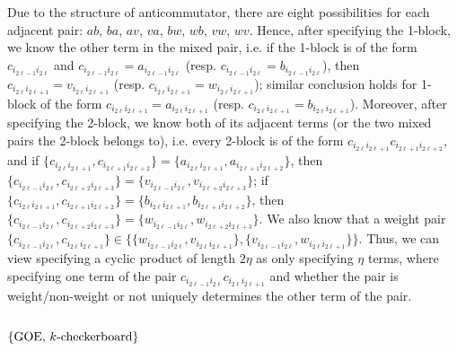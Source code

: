 \documentclass[11pt,reqno]{amsart}
\numberwithin{equation}{section}
\theoremstyle{plain}
\begin{document}
Due to the structure of anticommutator, there are eight possibilities for each adjacent pair: $ab$, $ba$, $av$, $va$, $bw$, $wb$, $vw$, $wv$. Hence, after specifying the 1-block, we know the other term in the mixed pair, i.e. if the 1-block is of the form $c_{i_{2\ell-1}i_{2\ell}}$ and $c_{i_{2\ell-1}i_{2\ell}}=a_{i_{2\ell-1}i_{2\ell}}$ (resp. $c_{i_{2\ell-1}i_{2\ell}}=b_{i_{2\ell-1}i_{2\ell}}$), then $c_{i_{2\ell}i_{2\ell+1}}=v_{i_{2\ell}i_{2\ell+1}}$ (resp. $c_{i_{2\ell}i_{2\ell+1}}=w_{i_{2\ell}i_{2\ell+1}}$); similar conclusion holds for 1-block of the form $c_{i_{2\ell}i_{2\ell+1}}=a_{i_{2\ell}i_{2\ell+1}}$ (resp. $c_{i_{2\ell}i_{2\ell+1}}=b_{i_{2\ell}i_{2\ell+1}}$). Moreover, after specifying the 2-block, we know both of its adjacent terms (or the two mixed pairs the 2-block belongs to), i.e. every 2-block is of the form $c_{i_{2\ell}i_{2\ell+1}}c_{i_{2\ell+1}i_{2\ell+2}}$, and if $\{c_{i_{2\ell}i_{2\ell+1}}, c_{i_{2\ell+1}i_{2\ell+2}}\}=\{a_{i_{2\ell}i_{2\ell+1}}, a_{i_{2\ell+1}i_{2\ell+2}}\}$, then $\{c_{i_{2\ell-1}i_{2\ell}}, c_{i_{2\ell+2}i_{2\ell+3}}\}=\{v_{i_{2\ell-1}i_{2\ell}}, v_{i_{2\ell+2}i_{2\ell+3}}\}$; if $\{c_{i_{2\ell}i_{2\ell+1}}, c_{i_{2\ell+1}i_{2\ell+2}}\}=\{b_{i_{2\ell}i_{2\ell+1}}, b_{i_{2\ell+1}i_{2\ell+2}}\}$, then $\{c_{i_{2\ell-1}i_{2\ell}}, c_{i_{2\ell+2}i_{2\ell+3}}\}=\{w_{i_{2\ell-1}i_{2\ell}}, w_{i_{2\ell+2}i_{2\ell+3}}\}$. We also know that a weight pair $\{c_{i_{2\ell-1}i_{2\ell}}, c_{i_{2\ell}i_{2\ell+1}}\}\in \{\{w_{i_{2\ell-1}i_{2\ell}}, v_{i_{2\ell}i_{2\ell+1}}\},\{v_{i_{2\ell-1}i_{2\ell}}, w_{i_{2\ell}i_{2\ell+1}}\}\}$. Thus, we can view specifying a cyclic product of length $2\eta$ as only specifying $\eta$ terms, where specifying one term of the pair $c_{i_{2\ell-1}i_{2\ell}}c_{i_{2\ell}i_{2\ell+1}}$ and whether the pair is weight/non-weight or not uniquely determines the other term of the pair.

\subsection{$\{\textup{GOE, }k\textup{-checkerboard}\}$} %
\end{document}
